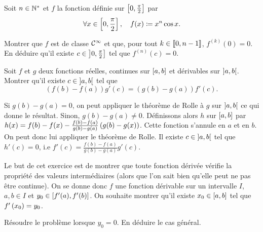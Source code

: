 \documentclass{magnolia}
\begin{document}
Soit $n\in{\mathbb{N}^*}$ et $f$ la fonction définie sur $\left[0,\frac{\pi}{2}\right]$ par
  \[\forall x\in\left[0,\frac{\pi}{2}\right] ,\quad f(x)\coloneqq x^n\cos x.\]
  \begin{questions}
  \question Montrer que $f$ est de classe $\mathcal{C}^{\infty}$ et que, pour tout $k\in\left\llbracket 0,n-1\right\rrbracket$, $f^{(k)}(0)=0$.
  \question En déduire qu'il existe $c\in\left]0,\frac{\pi}{2}\right]$ tel que $f^{(n)}(c)=0$.
  \end{questions}

Soit $f$ et $g$ deux fonctions réelles, continues sur $\left[a,b\right]$ et
dérivables sur $\left]a,b\right[$. Montrer qu'il existe $c\in\left]a,b\right[$ tel
que
\[(f(b)-f(a))g'(c)=(g(b)-g(a))f'(c).\]

\begin{sol}
Si $g(b)-g(a)=0$, on peut appliquer le théorème de Rolle à $g$ sur $\left]a,b\right[$ ce qui donne le résultat. Sinon, $g(b)-g(a)\neq 0$.
Définissons alors $h$ sur $\left[a,b\right]$ par $h(x)=f(b)-f(x)-\frac{f(b)-f(a)}{g(b)-g(a)}\left(g(b)-g(x)\right)$. Cette fonction s'annule en $a$ et en $b$. On peut donc lui appliquer le théorème de Rolle. Il existe $c\in \left]a,b\right[$ tel que $h'(c)=0$, i.e $f'(c)=\frac{f(b)-f(a)}{g(b)-g(a)}g'(c)$.
\end{sol}

Le but de cet exercice est de montrer que toute fonction dérivée vérifie la
propriété des valeurs intermédiaires (alors que l'on sait bien qu'elle peut
ne pas être continue). On se donne donc $f$ une fonction dérivable sur un
intervalle $I$, $a,b\in I$ et $y_0\in\left[f'(a),f'(b)\right]$. On souhaite
montrer qu'il existe $x_0\in\left[a,b\right]$ tel que $f'\left(x_0\right)=y_0$.
\begin{questions}
\question Résoudre le problème lorsque $y_0=0$.
\question En déduire le cas général.
\end{questions}
\end{document}
